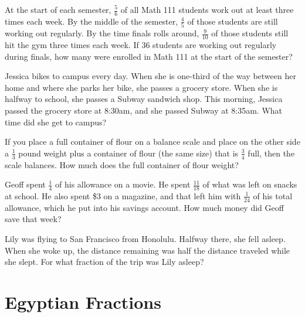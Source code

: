 \begin{problem}
At the start of each semester, $\frac 5 6$ of all Math 111 students work out at least three times each week.    By the middle of the semester, $\frac 4 5 $ of those students are still working out regularly.  By the time finals rolls around, $\frac 9{10}$ of those students still hit the gym three times each week.  If 36  students are working out regularly during finals, how many were enrolled in Math 111 at the start of the semester?
\end{problem}


\begin{problem}
Jessica bikes to campus every day.  When she is one-third of the way between her home and where she parks her bike, she passes a grocery store.   When she is halfway to school, she passes a Subway sandwich shop.  This morning, Jessica passed the grocery store at 8:30am, and she passed Subway at 8:35am.  What time did she get to campus?
\end{problem}

\begin{problem}
If you place a full container of flour on a balance scale and place on the other side a $\frac 1 3$ pound weight plus a container of flour (the same size) that is $\frac 3 4 $ full, then the scale balances.  How much does the full container of flour weight?

\end{problem}


\begin{problem}
Geoff spent $\frac 1 4$ of his allowance on a movie.  He spent $\frac{11}{18}$ of what was left on snacks at school.  He also spent \$3 on a magazine, and that left him with $\frac 1{24}$ of his total allowance, which he put into his savings account.  How much money did Geoff save that week?
\end{problem}


\begin{problem}
Lily was flying to San Francisco from Honolulu.  Halfway there, she fell asleep.  When she woke up, the distance remaining was half the distance traveled while she slept.  For what fraction of the trip was Lily asleep?
\end{problem}







\section{Egyptian Fractions}

